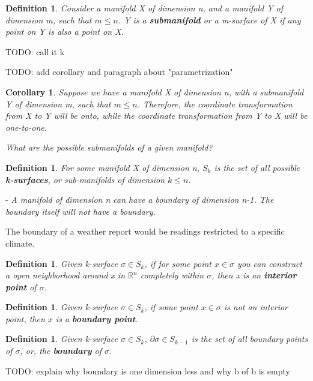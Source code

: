 \documentclass{book}
\newtheorem{defn}[equation]{Definition}
\newtheorem{coro}[equation]{Corollary}
\begin{document}
\begin{defn}
	Consider a manifold X of dimension n, and a manifold Y of dimension m, such that $m \leq n$. Y is a \textbf{submanifold} or a m-surface of X if any point on Y is also a point on X. 
\end{defn}

TODO: call it k

TODO: add corollary and paragraph about "parametrization"

\begin{coro}
	Suppose we have a manifold X of dimension n, with a submanifold Y of dimension m, such that $m \leq n$. Therefore, the coordinate transformation from X to Y will be onto, while the coordinate transformation from Y to X will be one-to-one. 
\end{coro}



\emph{What are the possible submanifolds of a given manifold?}


\begin{defn}
	For some manifold X of dimension n, $S_k$ is the set of all possible \textbf{k-surfaces}, or sub-manifolds of dimension $k \leq n$. 
\end{defn}

- \emph{A manifold of dimension n can have a boundary of dimension n-1. The boundary itself will not have a boundary.}

The boundary of a weather report would be readings restricted to a specific climate. 


\begin{defn}
	Given k-surface $\sigma \in S_k$, if for some point $x \in \sigma$ you can construct a open neighborhood around x in $\mathbb{R}^n$ completely within $\sigma$, then x is an \textbf{interior point} of $\sigma$. 
\end{defn}

\begin{defn}
	Given k-surface $\sigma \in S_k$, if some point $x \in \sigma$ is not an interior point, then $x$ is a \textbf{boundary point}.
\end{defn}

\begin{defn}
	Given k-surface $\sigma \in S_k$, $\partial\sigma \in S_{k-1}$ is the set of all boundary points of $\sigma$, or, the \textbf{boundary} of $\sigma$. 
\end{defn}

TODO: explain why boundary is one dimension less and why b of b is empty
\end{document}
